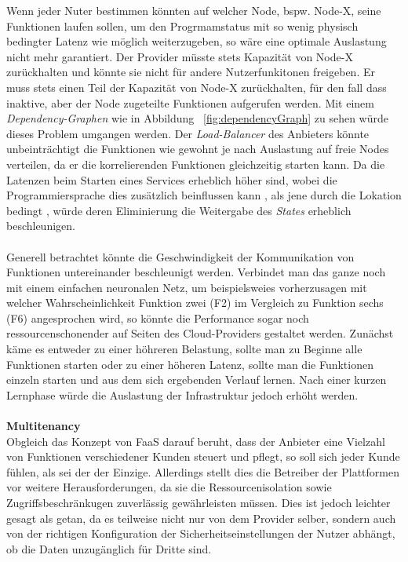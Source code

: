 \documentclass[11pt]{article}
\begin{document}
Wenn jeder Nuter bestimmen könnten auf welcher Node, bspw. Node-X, seine Funktionen laufen sollen, um den Progrmamstatus mit so wenig physisch bedingter Latenz wie möglich weiterzugeben, so wäre eine optimale Auslastung nicht mehr garantiert. Der Provider müsste stets Kapazität von Node-X zurückhalten und könnte sie nicht für andere Nutzerfunkitonen freigeben. Er muss stets einen Teil der Kapazität von Node-X zurückhalten, für den fall dass inaktive, aber der Node zugeteilte Funktionen aufgerufen werden. Mit einem \textit{Dependency-Graphen} wie in Abbildung ~\ref{fig:dependencyGraph} zu sehen würde dieses Problem umgangen werden. Der \textit{Load-Balancer} des Anbieters könnte unbeinträchtigt die Funktionen wie gewohnt je nach Auslastung auf freie Nodes verteilen, da er die korrelierenden Funktionen \glqq gleichzeitig\grqq{} starten kann. Da die Latenzen beim Starten eines Services erheblich höher sind, wobei die Programmiersprache dies zusätzlich beinflussen kann \cite{manner2018cold}, als jene durch die Lokation bedingt \cite{aditya2019will} \cite{jackson2018investigation}, würde deren Eliminierung die Weitergabe des \textit{States} erheblich beschleunigen. \\\\
Generell betrachtet könnte die Geschwindigkeit der Kommunikation von Funktionen untereinander beschleunigt werden. Verbindet man das ganze noch mit einem einfachen neuronalen Netz, um beispielsweies vorherzusagen mit welcher Wahrscheinlichkeit Funktion zwei (F2) im Vergleich zu Funktion sechs (F6) angesprochen wird, so könnte die Performance sogar noch ressourcenschonender auf Seiten des Cloud-Providers gestaltet werden. Zunächst käme es entweder zu einer höhreren Belastung, sollte man zu Beginne alle Funktionen starten oder zu einer höheren Latenz, sollte man die Funktionen einzeln starten und aus dem sich ergebenden Verlauf lernen. Nach einer kurzen Lernphase würde die Auslastung der Infrastruktur jedoch erhöht werden. \\\\
\glqq \textbf{Multitenancy}\grqq{}\\
Obgleich das Konzept von FaaS darauf beruht, dass der Anbieter eine Vielzahl von Funktionen verschiedener Kunden steuert und pflegt, so soll sich jeder Kunde fühlen, als sei der der Einzige. Allerdings stellt dies die Betreiber der Plattformen vor weitere Herausforderungen, da sie die Ressourcenisolation sowie Zugriffsbeschränkugen zuverlässig gewährleisten müssen. Dies ist jedoch leichter gesagt als getan, da es teilweise nicht nur von dem Provider selber, sondern auch von der richtigen Konfiguration der Sicherheitseinstellungen der Nutzer \cite{Heller2017} \cite{Heller2017} abhängt, ob die Daten unzugänglich für Dritte sind. \\\\
\end{document}

